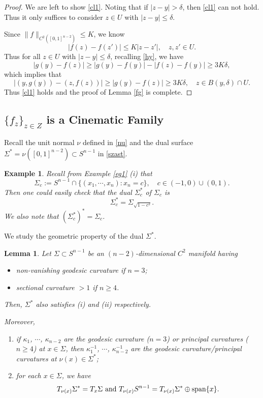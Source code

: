 \documentclass[11pt,a4paper,reqno]{amsart}
\newcommand{\1}{\mathbf{1}}
\numberwithin{equation}{section}
\theoremstyle{plain}
\newtheorem{lemma}[equation]{Lemma}
\newtheorem{ex}[equation]{Example}
\theoremstyle{definition}
\theoremstyle{remark}
\begin{document}
\begin{proof}
  We are left to show \eqref{cl1}.
  Noting that if $|z-y|> \delta$, then \eqref{cl1} can not hold.
  Thus it only suffices to consider $z \in U$ with $|z-y| \le \delta$.

  Since $\|f\|_{C^2([0,1]^{n-2})} \le K$, we know
  $$  |f(z)-f(z')| \le K|z-z'|, \quad z,z' \in U. $$
  Thus for all $z \in U$ with $|z-y| \le \delta$, recalling \eqref{hy}, we have
  $$   |g(y)-f(z)| \ge |g(y)-f(y)| - |f(z)-f(y)| \ge 3K\delta,  $$
   which implies that
  $$  |(y, g(y))-(z, f(z)) | \ge |g(y)-f(z)|\ge 3K\delta, \quad z \in B(y,\delta) \cap U.   $$
 Thus \eqref{cl1} holds and
    the proof of Lemma \ref{fg} is complete.
\end{proof}



\subsection{$\{f_z\}_{z \in Z}$ is a Cinematic Family}

Recall the unit normal $\nu$ defined in \eqref{nu} and the dual surface $\Sigma^\ast= \nu([0,1]^{n-2}) \subset S^{n-1}$ in \eqref{szast}.


\begin{ex} \label{eg2}
   \rm
  Recall from Example \ref{eg1} (i) that
  $$ \Sigma_c:= S^{n-1} \cap \{(x_1, \cdots, x_n) : x_n =c\}, \quad c\in (-1,0)\cup(0,1). $$
  Then one could easily check that the dual $\Sigma^\ast_c$ of $\Sigma_c$ is
  $$ \Sigma_c^\ast= \Sigma_{\sqrt{1-c^2}}. $$
  We also note that $(\Sigma_c^\ast)^\ast = \Sigma_c$.
\end{ex}

We study the geometric property of the dual $\Sigma^\ast$.

\begin{lemma} \label{dual}
   Let $\Sigma \subset S^{n-1}$ be an $(n-2)$-dimensional $C^2$ manifold having
\begin{itemize}
  \item[(i)] non-vanishing geodesic curvature if $n=3$;
  \item[(ii)] sectional curvature $>1$ if $n \ge 4$.
\end{itemize}
  Then, $\Sigma^\ast$ also satisfies (i) and (ii) respectively.

  Moreover,
  \begin{enumerate}
  \item[(a)] if $\kappa_1$, $\cdots$, $\kappa_{n-2}$ are the geodesic curvature ($n=3$) or principal curvatures ($n\ge4$) at $x \in \Sigma$, then $\kappa_1^{-1}$, $\cdots$, $\kappa_{n-2}^{-1}$ are the geodesic curvature/principal curvatures at $\nu(x) \in \Sigma^\ast$;
  \item[(b)] for each $x \in \Sigma$, we have
  $$  T_{\nu(x)}\Sigma^\ast = T_{x}\Sigma  \mbox{ and } T_{\nu(x)}S^{n-1} = T_{\nu(x)}\Sigma^\ast \oplus {\rm span}\{x\}.  $$
  \end{enumerate}
\end{lemma}
\end{document}
